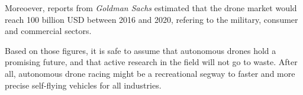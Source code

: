 Moreoever, reports from \emph{Goldman Sachs} \cite{TopTal} estimated that the
drone market would reach 100 billion USD between 2016 and 2020, refering to the
military, consumer and commercial sectors.%


Based on those figures, it is safe to assume that autonomous drones hold a
promising future, and that active research in the field will not go to waste.
After all, autonomous drone racing might be a recreational segway to faster and
more precise self-flying vehicles for all industries.
